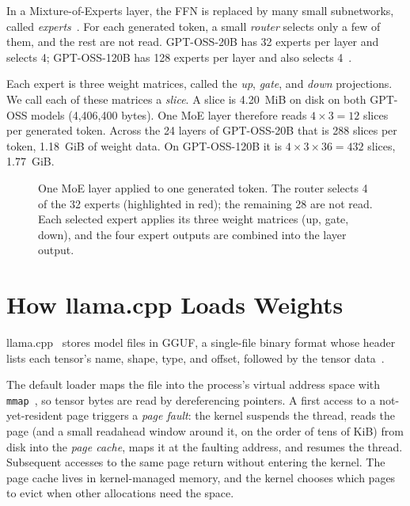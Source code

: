 In a Mixture-of-Experts layer, the FFN is replaced by many small subnetworks, called \emph{experts}~\cite{shazeer2017moe}.
For each generated token, a small \emph{router} selects only a few of them, and the rest are not read.
GPT-OSS-20B has 32 experts per layer and selects 4; GPT-OSS-120B has 128 experts per layer and also selects 4~\cite{openai2025gptoss}.

Each expert is three weight matrices, called the \emph{up}, \emph{gate}, and \emph{down} projections.
We call each of these matrices a \emph{slice}.
A slice is 4.20~MiB on disk on both GPT-OSS models (4{,}406{,}400 bytes).
One MoE layer therefore reads $4 \times 3 = 12$ slices per generated token.
Across the 24 layers of GPT-OSS-20B that is 288 slices per token, 1.18~GiB of weight data.
On GPT-OSS-120B it is $4 \times 3 \times 36 = 432$ slices, 1.77~GiB.

\begin{figure}[htbp]
\centering
\resizebox{0.95\textwidth}{!}{}
\caption[Mixture-of-Experts layer for one generated token]{One MoE layer applied to one generated token. The router selects 4 of the 32 experts (highlighted in red); the remaining 28 are not read. Each selected expert applies its three weight matrices (up, gate, down), and the four expert outputs are combined into the layer output.}
\label{fig:moe-ffn-dataflow}
\end{figure}


\section{How llama.cpp Loads Weights}\label{sec:bg-llamacpp}

llama.cpp~\cite{ggerganov2023llamacpp} stores model files in GGUF, a single-file binary format whose header lists each tensor's name, shape, type, and offset, followed by the tensor data~\cite{gguf_spec}.

The default loader maps the file into the process's virtual address space with \texttt{mmap}~\cite{mmap_man}, so tensor bytes are read by dereferencing pointers.
A first access to a not-yet-resident page triggers a \emph{page fault}: the kernel suspends the thread, reads the page (and a small readahead window around it, on the order of tens of KiB) from disk into the \emph{page cache}, maps it at the faulting address, and resumes the thread.
Subsequent accesses to the same page return without entering the kernel.
The page cache lives in kernel-managed memory, and the kernel chooses which pages to evict when other allocations need the space.


